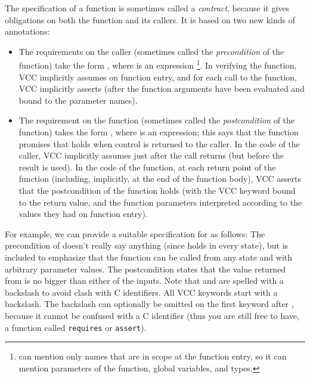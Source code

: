 The specification of a function is sometimes called a \emph{contract},
because it gives obligations on both the function and its callers. It
is based on two new kinds of annotations:
\begin{itemize}
\item The requirements on the caller (sometimes called the
  \emph{precondition} of the function) take the form 
  , 
  where  is an expression%
  \footnote{
     can mention only names that are in scope at the function entry, 
    so it can mention parameters of the function, global variables, and
    types.}.  
  In verifying the function, VCC implicitly assumes
   on function entry, and for each call to the function, VCC
  implicitly asserts  (after the function arguments have been
  evaluated and bound to the parameter names).

\item The requirement on the function  (sometimes called the
  \emph{postcondition} of the function) takes the form
  , where  is an expression; this says that
  the function promises that  holds when control is returned to
  the caller.  In the code of the caller, VCC implicitly assumes 
  just after the call returns (but
  before the result is used). In the code of the function, at each return
  point of the function (including, implicitly,
  at the end of the function body), VCC asserts that the postcondition
  of the function holds (with the VCC keyword \vcc{\result} bound to the
  return value, and the function parameters 
  interpreted according to the values they had on function entry).
\end{itemize}

For example, we can provide a suitable specification for  as
follows:
\noindent
The precondition  of  doesn't
really say anything (since \vcc{\true} holds in every state), but is included
to emphasize that the function can be called from any state and
with arbitrary parameter values.
The postcondition states that the value returned from  
is no bigger than either of the inputs.
Note that \vcc{\true} and \vcc{\result} are spelled with a backslash
to avoid clash with C identifiers.
All VCC keywords start with a backslash.
The backslash can optionally be omitted on the first keyword after \vcc{_}, because it cannot
be confused with a C identifier (thus you are still free to have, \eg
a function called \texttt{requires} or \texttt{assert}).

